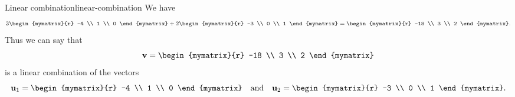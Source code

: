 \begin{example}{Linear combination}{linear-combination}
  We have
  \begin{equation*}
    3
    \begin{mymatrix}{r}
      -4 \\
      1 \\
      0
    \end{mymatrix}
    +
    2
    \begin{mymatrix}{r}
      -3 \\
      0 \\
      1
    \end{mymatrix}
    =
    \begin{mymatrix}{r}
      -18 \\
      3 \\
      2
    \end{mymatrix}.
  \end{equation*}
  Thus we can say that
  \begin{equation*}
    \vect{v}= \begin{mymatrix}{r}
      -18 \\
      3 \\
      2
    \end{mymatrix}
  \end{equation*}
  is a linear combination of the vectors
  \begin{equation*}
    \vect{u}_1 = \begin{mymatrix}{r}
      -4 \\
      1 \\
      0
    \end{mymatrix}
    \quad\mbox{and}\quad
    \vect{u}_2 =
    \begin{mymatrix}{r}
      -3 \\
      0 \\
      1
    \end{mymatrix}.
  \end{equation*}
\end{example}

